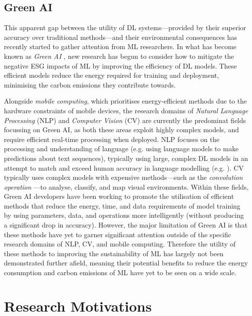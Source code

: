 \documentclass[a4paper, 11pt]{report}
\begin{document}
    \subsection{Green AI}

    This apparent gap between the utility of DL systems---provided by their superior accuracy over traditional methods---and their environmental consequences has recently started to gather attention from ML researchers. In what has become known as \emph{Green AI} \citep{schwartz-2019}, new research has begun to consider how to mitigate the negative ESG impacts of ML by improving the efficiency of DL models. These efficient models reduce the energy required for training and deployment, minimising the carbon emissions they contribute towards. 

    Alongside \emph{mobile computing}, which prioritises energy-efficient methods due to the hardware constraints of mobile devices, the research domains of \emph{Natural Language Processing} (NLP) and \emph{Computer Vision} (CV) are currently the predominat fields focussing on Green AI, as both these areas exploit highly complex models, and require efficient real-time processing when deployed. NLP focuses on the processing and understanding of language (e.g. using language models to make predictions about text sequences), typically using large, complex DL models in an attempt to match and exceed human accuracy in language modelling (e.g. \citet{chowdhery-2022}). CV typically uses complex models with expensive methods---such as the \emph{convolution operation} \citep{dumoulin-2018}---to analyse, classify, and map visual environments. Within these fields, Green AI developers have been working to promote the utilisation of efficient methods that reduce the energy, time, and data requirements of model training by using parameters, data, and operations more intelligently (without producing a significant drop in accuracy). However, the major limitation of Green AI is that these methods have yet to garner significant attention outside of the specific research domains of NLP, CV, and mobile computing. Therefore the utility of these methods to improving the sustainability of ML has largely not been demonstrated further afield, meaning their potential benefits to reduce the energy consumption and carbon emissions of ML have yet to be seen on a wide scale.


    \section{Research Motivations}
    \label{section: motivations}
\end{document}
